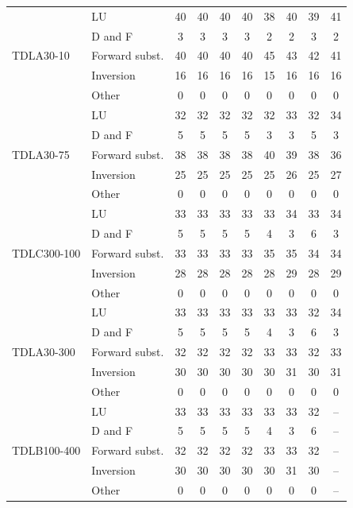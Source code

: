 \begin{table}[htbp]
\begin{tabular}{llcccccccc}
\multirow{5}{*}{TDLA30-10} & LU & 40 & 40 & 40 & 40 & 38 & 40 & 39 & 41 \\
 & D and F & 3 & 3 & 3 & 3 & 2 & 2 & 3 & 2 \\
 & Forward subst. & 40 & 40 & 40 & 40 & 45 & 43 & 42 & 41 \\
 & Inversion & 16 & 16 & 16 & 16 & 15 & 16 & 16 & 16 \\
 & Other & 0 & 0 & 0 & 0 & 0 & 0 & 0 & 0 \\
\midrule
\multirow{5}{*}{TDLA30-75} & LU & 32 & 32 & 32 & 32 & 32 & 33 & 32 & 34 \\
 & D and F & 5 & 5 & 5 & 5 & 3 & 3 & 5 & 3 \\
 & Forward subst. & 38 & 38 & 38 & 38 & 40 & 39 & 38 & 36 \\
 & Inversion & 25 & 25 & 25 & 25 & 25 & 26 & 25 & 27 \\
 & Other & 0 & 0 & 0 & 0 & 0 & 0 & 0 & 0 \\
\midrule
\multirow{5}{*}{TDLC300-100} & LU & 33 & 33 & 33 & 33 & 33 & 34 & 33 & 34 \\
 & D and F & 5 & 5 & 5 & 5 & 4 & 3 & 6 & 3 \\
 & Forward subst. & 33 & 33 & 33 & 33 & 35 & 35 & 34 & 34 \\
 & Inversion & 28 & 28 & 28 & 28 & 28 & 29 & 28 & 29 \\
 & Other & 0 & 0 & 0 & 0 & 0 & 0 & 0 & 0 \\
\midrule
\multirow{5}{*}{TDLA30-300} & LU & 33 & 33 & 33 & 33 & 33 & 33 & 32 & 34 \\
 & D and F & 5 & 5 & 5 & 5 & 4 & 3 & 6 & 3 \\
 & Forward subst. & 32 & 32 & 32 & 32 & 33 & 33 & 32 & 33 \\
 & Inversion & 30 & 30 & 30 & 30 & 30 & 31 & 30 & 31 \\
 & Other & 0 & 0 & 0 & 0 & 0 & 0 & 0 & 0 \\
\midrule
\multirow{5}{*}{TDLB100-400} & LU & 33 & 33 & 33 & 33 & 33 & 33 & 32 & -- \\
 & D and F & 5 & 5 & 5 & 5 & 4 & 3 & 6 & -- \\
 & Forward subst. & 32 & 32 & 32 & 32 & 33 & 33 & 32 & -- \\
 & Inversion & 30 & 30 & 30 & 30 & 30 & 31 & 30 & -- \\
 & Other & 0 & 0 & 0 & 0 & 0 & 0 & 0 & -- \\
\bottomrule
\end{tabular}
\vspace{4pt}
\end{table}

